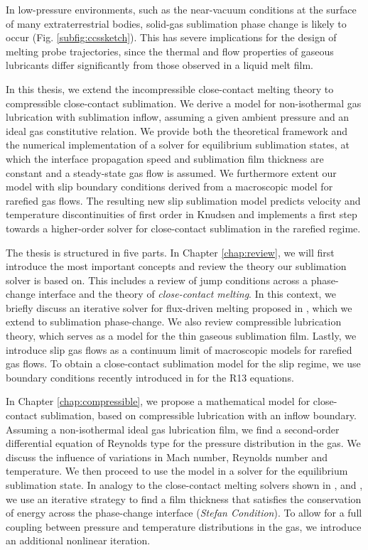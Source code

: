 In low-pressure environments, such as the near-vacuum conditions at the surface of many extraterrestrial bodies, solid-gas sublimation phase change is likely to occur (Fig. \ref{subfig:ccssketch}). This has severe implications for the design of melting probe trajectories, since the thermal and flow properties of gaseous lubricants differ significantly from those observed in a liquid melt film.

In this thesis, we extend the incompressible close-contact melting theory to compressible close-contact sublimation. We derive a model for non-isothermal gas lubrication with sublimation inflow, assuming a given ambient pressure and an ideal gas constitutive relation. We provide both the theoretical framework and the numerical implementation of a solver for equilibrium sublimation states, at which the interface propagation speed and sublimation film thickness are constant and a steady-state gas flow is assumed. We furthermore extent our model with slip boundary conditions derived from a macroscopic model for rarefied gas flows. The resulting new slip sublimation model predicts velocity and temperature discontinuities of first order in Knudsen and implements a first step towards a higher-order solver for close-contact sublimation in the rarefied regime.

The thesis is structured in five parts. In Chapter \ref{chap:review}, we will first introduce the most important concepts and review the theory our sublimation solver is based on. This includes a review of jump conditions across a phase-change interface and the theory of \textit{close-contact melting}. In this context, we briefly discuss an iterative solver for flux-driven melting proposed in \cite{schuller2019icarus}, which we extend to sublimation phase-change. We also review compressible lubrication theory, which serves as a model for the thin gaseous sublimation film. 
Lastly, we introduce slip gas flows as a continuum limit of macroscopic models for rarefied gas flows. To obtain a close-contact sublimation model for the slip regime, we use boundary conditions recently introduced in \cite{beckmann2018evaporation} for the R13 equations.

In Chapter \ref{chap:compressible}, we propose a mathematical model for close-contact sublimation, based on compressible lubrication with an inflow boundary. Assuming a non-isothermal ideal gas lubrication film, we find a second-order differential equation of Reynolds type for the pressure distribution in the gas.
We discuss the influence of variations in Mach number, Reynolds number and temperature. We then proceed to use the model in a solver for the equilibrium sublimation state. In analogy to the close-contact melting solvers shown in \cite{schuller2017spatially}, \cite{schuller2019icarus} and \cite{schuller2016curvilinearccm}, we use an iterative strategy to find a film thickness that satisfies the conservation of energy across the phase-change interface (\textit{Stefan Condition}). 
To allow for a full coupling between pressure and temperature distributions in the gas, we introduce an additional nonlinear iteration.


